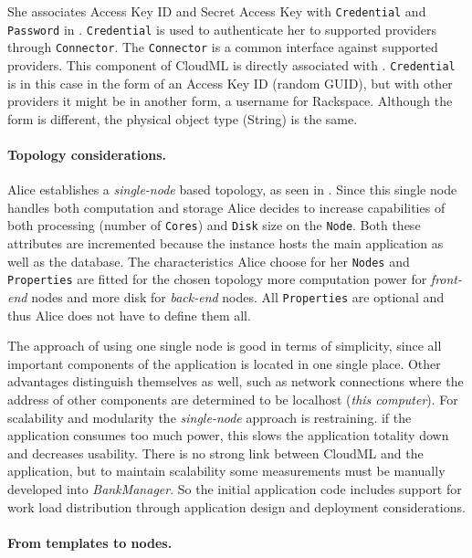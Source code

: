 She associates Access Key ID and Secret Access Key with 
\texttt{Credential} and \texttt{Password} in .
\texttt{Credential} is used to authenticate her to supported providers through \texttt{Connector}.
The \texttt{Connector} is a common interface against supported providers.
This component of CloudML is directly associated with .
\texttt{Credential} is in this case in the form of an Access Key ID (random GUID),
but with other providers it might be in another form, \eg a username for Rackspace.
Although the form is different, the physical object type (String) is the same.

\paragraph{Topology considerations.}

Alice establishes a \emph{single-node} based topology, as seen in .
Since this single node handles both computation and storage Alice decides to 
increase capabilities of both processing (number of \texttt{Cores}) and 
\texttt{Disk} size on the \texttt{Node}.
Both these attributes are incremented because the instance hosts
the main application as well as the database.
The characteristics Alice choose for her \texttt{Nodes} and \texttt{Properties} are fitted
for the chosen topology \eg more computation power for 
\emph{front-end} nodes and more disk for \emph{back-end} nodes.
All \texttt{Properties} are optional and thus Alice does not have to define them all.

The approach of using one single node is good in terms of simplicity,
since all important components of the application is located in one single place.
Other advantages distinguish themselves as well, such as network connections where
the address of other components are determined to be localhost (\emph{this computer}).
For scalability and modularity the \emph{single-node} approach is restraining.
\eg if the application consumes too much  power, 
this slows the application totality down and decreases usability.
There is no strong link between CloudML and the application, but to maintain
scalability some measurements must be manually developed into \emph{BankManager}.
So the initial application code includes support for work load distribution through 
application design and deployment considerations.

\paragraph{From templates to nodes.}

